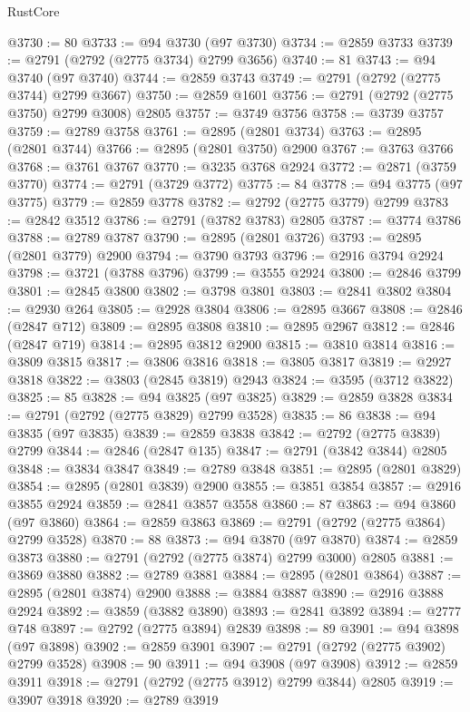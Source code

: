 \begin{lexlean}{RustCore}
\begin{coremodule}
@3730 := 80
@3733 := @94 @3730 (@97 @3730)
@3734 := @2859 @3733
@3739 := @2791 (@2792 (@2775 @3734) @2799 @3656)
@3740 := 81
@3743 := @94 @3740 (@97 @3740)
@3744 := @2859 @3743
@3749 := @2791 (@2792 (@2775 @3744) @2799 @3667)
@3750 := @2859 @1601
@3756 := @2791 (@2792 (@2775 @3750) @2799 @3008) @2805
@3757 := @3749 @3756
@3758 := @3739 @3757
@3759 := @2789 @3758
@3761 := @2895 (@2801 @3734)
@3763 := @2895 (@2801 @3744)
@3766 := @2895 (@2801 @3750) @2900
@3767 := @3763 @3766
@3768 := @3761 @3767
@3770 := @3235 @3768 @2924
@3772 := @2871 (@3759 @3770)
@3774 := @2791 (@3729 @3772)
@3775 := 84
@3778 := @94 @3775 (@97 @3775)
@3779 := @2859 @3778
@3782 := @2792 (@2775 @3779) @2799
@3783 := @2842 @3512
@3786 := @2791 (@3782 @3783) @2805
@3787 := @3774 @3786
@3788 := @2789 @3787
@3790 := @2895 (@2801 @3726)
@3793 := @2895 (@2801 @3779) @2900
@3794 := @3790 @3793
@3796 := @2916 @3794 @2924
@3798 := @3721 (@3788 @3796)
@3799 := @3555 @2924
@3800 := @2846 @3799
@3801 := @2845 @3800
@3802 := @3798 @3801
@3803 := @2841 @3802
@3804 := @2930 @264
@3805 := @2928 @3804
@3806 := @2895 @3667
@3808 := @2846 (@2847 @712)
@3809 := @2895 @3808
@3810 := @2895 @2967
@3812 := @2846 (@2847 @719)
@3814 := @2895 @3812 @2900
@3815 := @3810 @3814
@3816 := @3809 @3815
@3817 := @3806 @3816
@3818 := @3805 @3817
@3819 := @2927 @3818
@3822 := @3803 (@2845 @3819) @2943
@3824 := @3595 (@3712 @3822)
@3825 := 85
@3828 := @94 @3825 (@97 @3825)
@3829 := @2859 @3828
@3834 := @2791 (@2792 (@2775 @3829) @2799 @3528)
@3835 := 86
@3838 := @94 @3835 (@97 @3835)
@3839 := @2859 @3838
@3842 := @2792 (@2775 @3839) @2799
@3844 := @2846 (@2847 @135)
@3847 := @2791 (@3842 @3844) @2805
@3848 := @3834 @3847
@3849 := @2789 @3848
@3851 := @2895 (@2801 @3829)
@3854 := @2895 (@2801 @3839) @2900
@3855 := @3851 @3854
@3857 := @2916 @3855 @2924
@3859 := @2841 @3857 @3558
@3860 := 87
@3863 := @94 @3860 (@97 @3860)
@3864 := @2859 @3863
@3869 := @2791 (@2792 (@2775 @3864) @2799 @3528)
@3870 := 88
@3873 := @94 @3870 (@97 @3870)
@3874 := @2859 @3873
@3880 := @2791 (@2792 (@2775 @3874) @2799 @3000) @2805
@3881 := @3869 @3880
@3882 := @2789 @3881
@3884 := @2895 (@2801 @3864)
@3887 := @2895 (@2801 @3874) @2900
@3888 := @3884 @3887
@3890 := @2916 @3888 @2924
@3892 := @3859 (@3882 @3890)
@3893 := @2841 @3892
@3894 := @2777 @748
@3897 := @2792 (@2775 @3894) @2839
@3898 := 89
@3901 := @94 @3898 (@97 @3898)
@3902 := @2859 @3901
@3907 := @2791 (@2792 (@2775 @3902) @2799 @3528)
@3908 := 90
@3911 := @94 @3908 (@97 @3908)
@3912 := @2859 @3911
@3918 := @2791 (@2792 (@2775 @3912) @2799 @3844) @2805
@3919 := @3907 @3918
@3920 := @2789 @3919

\end{coremodule}
\end{lexlean}
